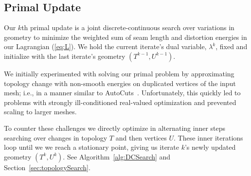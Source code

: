 \subsection{Primal Update}
\label{sec:primalUpdate}
Our $k$th primal update is a joint discrete-continuous search over variations in geometry to minimize the weighted sum of seam length and distortion energies in our Lagrangian (\ref{eq:L}). We hold the current iterate's dual variable, $\lambda^k$, fixed and initialize with the last iterate's geometry $(T^{k-1}, U^{k-1})$.


We initially experimented with solving our primal problem by approximating topology change with non-smooth energies on duplicated vertices of the input mesh; i.e., in a manner similar to AutoCuts\ \cite{Poranne2017Autocuts}. Unfortunately, this quickly led to problems with strongly ill-conditioned real-valued optimization and prevented scaling to larger meshes. 

To counter these challenges we directly optimize in alternating inner steps searching over changes in topology $T$ and then vertices $U$. These inner iterations loop until we 
we reach a stationary point, 
giving us iterate $k$'s newly updated geometry $(T^{k}, U^{k})$. See Algorithm~\ref{alg:DCSearch} and Section\ \ref{sec:topologySearch}. 


